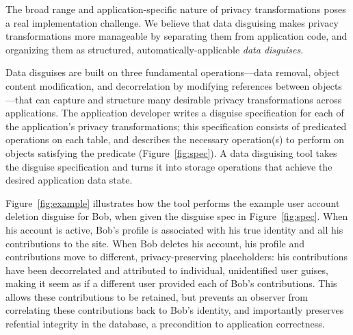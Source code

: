 The broad range and application-specific nature of privacy transformations poses a real
implementation challenge. We believe that data disguising makes
privacy transformations more manageable by separating them from application code,
and organizing them as structured, automatically-applicable \emph{data disguises}.

Data disguises are built on three fundamental operations---data removal, object content
modification, and decorrelation by modifying references between objects---that can capture and
structure many desirable privacy transformations across applications.
%
The application developer writes a disguise specification for each of the application's privacy
transformations; this specification consists of predicated operations on each table, and describes
the necessary operation(s) to perform on objects satisfying the predicate (Figure~\ref{fig:spec}).
A data disguising tool takes the disguise specification and turns it into storage operations that
achieve the desired application data state.

Figure~\ref{fig:example} illustrates how the tool performs the example user
account deletion disguise for Bob, when given the disguise spec in Figure~\ref{fig:spec}.
%
When his account is active, Bob's profile is associated with his true identity and all his
contributions to the site.
%
When Bob deletes his account, his profile and contributions move to different, privacy-preserving
placeholders:
his contributions have been decorrelated and attributed to individual, unidentified user guises,
making it seem as if a different user provided each of Bob's contributions.
%
This allows these contributions to be retained, but prevents an observer from correlating these
contributions back to Bob's identity, and
importantly preserves refential integrity in the database, a precondition to application
correctness.


%
%
%

